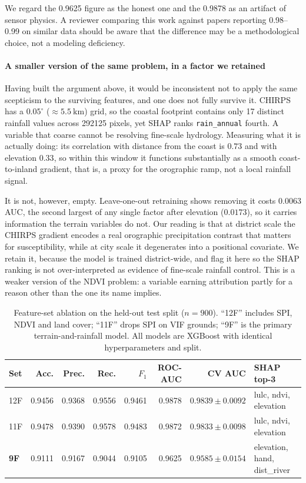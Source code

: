 \documentclass[10pt,twocolumn]{article}
\begin{document}
We regard the 0.9625 figure as the honest one and the 0.9878 as an artifact of
sensor physics. A reviewer comparing this work against papers reporting
0.98--0.99 on similar data should be aware that the difference may be a
methodological choice, not a modeling deficiency.

\paragraph{A smaller version of the same problem, in a factor we retained}
Having built the argument above, it would be inconsistent not to apply the same
scepticism to the surviving features, and one does not fully survive it. CHIRPS
has a $0.05^\circ$ ($\approx\SI{5.5}{\kilo\metre}$) grid, so the coastal footprint
contains only 17 distinct rainfall values across \num{292125} pixels, yet SHAP
ranks \texttt{rain\_annual} fourth. A variable that coarse cannot be resolving
fine-scale hydrology. Measuring what it is actually doing: its correlation with
distance from the coast is $0.73$ and with elevation $0.33$, so within this
window it functions substantially as a smooth coast-to-inland gradient, that is,
a proxy for the orographic ramp, not a local rainfall signal.

It is not, however, empty. Leave-one-out retraining shows removing it costs
$0.0063$ AUC, the second largest of any single factor after elevation
($0.0173$), so it carries information the terrain variables do not. Our reading
is that at district scale the CHIRPS gradient encodes a real orographic
precipitation contrast that matters for susceptibility, while at city scale it
degenerates into a positional covariate. We retain it, because the model is
trained district-wide, and flag it here so the SHAP ranking is not
over-interpreted as evidence of fine-scale rainfall control. This is a weaker
version of the NDVI problem: a variable earning attribution partly for a reason
other than the one its name implies.

\begin{table}[!t]
\centering\footnotesize
\caption{Feature-set ablation on the held-out test split ($n=900$). ``12F''
includes SPI, NDVI and land cover; ``11F'' drops SPI on VIF grounds; ``9F'' is
the primary terrain-and-rainfall model. All models are XGBoost with identical
hyperparameters and split.}
\label{tab:ablation}
\small
\begin{tabular}{@{}lrrrrrrl@{}}
\toprule
\textbf{Set} & \textbf{Acc.} & \textbf{Prec.} & \textbf{Rec.} & \textbf{$F_1$} &
\textbf{ROC-AUC} & \textbf{CV AUC} & \textbf{SHAP top-3} \\
\midrule
12F & 0.9456 & 0.9368 & 0.9556 & 0.9461 & 0.9878 & $0.9839\pm0.0092$ & lulc, ndvi, elevation \\
11F & 0.9478 & 0.9390 & 0.9578 & 0.9483 & 0.9872 & $0.9833\pm0.0098$ & lulc, ndvi, elevation \\
\textbf{9F} & 0.9111 & 0.9167 & 0.9044 & 0.9105 & 0.9625 & $0.9585\pm0.0154$ & elevation, hand, dist\_river \\
\bottomrule
\end{tabular}
\end{table}
\end{document}
